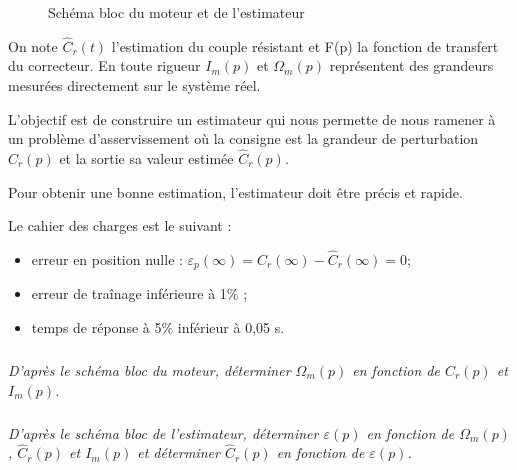 \documentclass[10pt]{article}
\begin{document}
{\begin{figure}[!h]
\begin{center}
\caption{Schéma bloc du moteur et de l’estimateur \label{fig_11}}
\end{center}
\end{figure}

On note $\hat{C}_r(t)$ l'estimation du couple résistant et F(p) la fonction de transfert du correcteur. En toute rigueur $I_m(p)$ et $\Omega_m(p)$ représentent des grandeurs mesurées directement sur le système réel.

L’objectif est de construire un estimateur qui nous permette de nous ramener à un problème d'asservissement où la consigne est la grandeur de perturbation $C_r(p)$ et la sortie sa valeur estimée $\hat{C}_r(p)$.

Pour obtenir une bonne estimation, l’estimateur doit être précis et rapide.

Le cahier des charges est le suivant :
\begin{itemize}
\item erreur en position nulle : $\varepsilon_p (\infty) = C_r(\infty)-\hat{C}_r(\infty) = 0$;
\item erreur de traînage inférieure à 1\% ;
\item temps de réponse à 5\% inférieur à 0,05 s.
\end{itemize}
}

\subparagraph{}
\textit{D'après le schéma bloc du moteur, déterminer $\Omega_m(p)$ en fonction de $C_r(p)$ et $I_m(p)$.}


\subparagraph{}
\textit{D'après le schéma bloc de l'estimateur, déterminer $\varepsilon(p)$ en fonction de $\Omega_m(p)$, $\hat{C}_r(p)$ et $I_m(p)$ et déterminer $\hat{C}_r(p)$ en fonction de $\varepsilon(p)$.}
\end{document}
